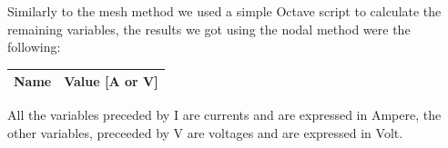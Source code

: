 Similarly to the mesh method we used a simple Octave script to calculate the remaining variables, the results we got using the nodal method were the following: 

\begin{center}
  \begin{tabular}{ | c | c | }
    \hline    
    {\bf Name} & {\bf Value [A or V]} \\ \hline
    \hline
  \end{tabular}
\end{center}
All the variables preceded by I are currents and are expressed in Ampere, the other variables, preceeded by V are voltages and are expressed in Volt.




